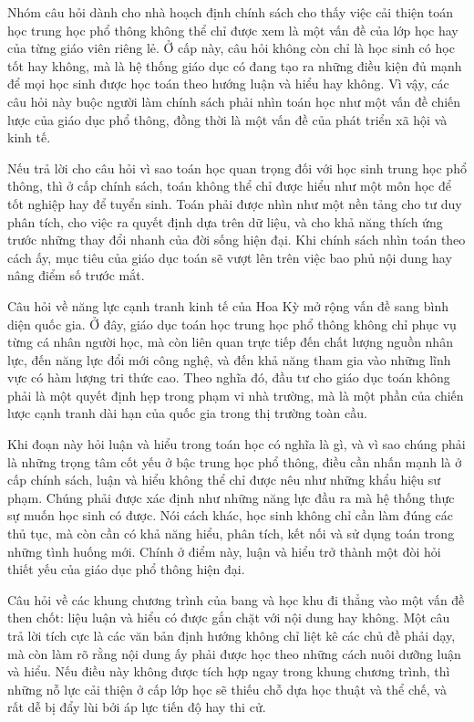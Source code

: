 \documentclass[
  10pt,
  a4paper,
  landscape,
  twoside,
  openany
]{scrbook}
\newcommand{\NOTE}[1]{#1}
\begin{document}
{
\NOTE{Nhóm câu hỏi dành cho nhà hoạch định chính sách cho thấy việc cải thiện toán học trung học phổ thông không thể chỉ được xem là một vấn đề của lớp học hay của từng giáo viên riêng lẻ. Ở cấp này, câu hỏi không còn chỉ là học sinh có học tốt hay không, mà là hệ thống giáo dục có đang tạo ra những điều kiện đủ mạnh để mọi học sinh được học toán theo hướng luận và hiểu hay không. Vì vậy, các câu hỏi này buộc người làm chính sách phải nhìn toán học như một vấn đề chiến lược của giáo dục phổ thông, đồng thời là một vấn đề của phát triển xã hội và kinh tế.

Nếu trả lời cho câu hỏi vì sao toán học quan trọng đối với học sinh trung học phổ thông, thì ở cấp chính sách, toán không thể chỉ được hiểu như một môn học để tốt nghiệp hay để tuyển sinh. Toán phải được nhìn như một nền tảng cho tư duy phân tích, cho việc ra quyết định dựa trên dữ liệu, và cho khả năng thích ứng trước những thay đổi nhanh của đời sống hiện đại. Khi chính sách nhìn toán theo cách ấy, mục tiêu của giáo dục toán sẽ vượt lên trên việc bao phủ nội dung hay nâng điểm số trước mắt.

Câu hỏi về năng lực cạnh tranh kinh tế của Hoa Kỳ mở rộng vấn đề sang bình diện quốc gia. Ở đây, giáo dục toán học trung học phổ thông không chỉ phục vụ từng cá nhân người học, mà còn liên quan trực tiếp đến chất lượng nguồn nhân lực, đến năng lực đổi mới công nghệ, và đến khả năng tham gia vào những lĩnh vực có hàm lượng tri thức cao. Theo nghĩa đó, đầu tư cho giáo dục toán không phải là một quyết định hẹp trong phạm vi nhà trường, mà là một phần của chiến lược cạnh tranh dài hạn của quốc gia trong thị trường toàn cầu.

Khi đoạn này hỏi luận và hiểu trong toán học có nghĩa là gì, và vì sao chúng phải là những trọng tâm cốt yếu ở bậc trung học phổ thông, điều cần nhấn mạnh là ở cấp chính sách, luận và hiểu không thể chỉ được nêu như những khẩu hiệu sư phạm. Chúng phải được xác định như những năng lực đầu ra mà hệ thống thực sự muốn học sinh có được. Nói cách khác, học sinh không chỉ cần làm đúng các thủ tục, mà còn cần có khả năng hiểu, phân tích, kết nối và sử dụng toán trong những tình huống mới. Chính ở điểm này, luận và hiểu trở thành một đòi hỏi thiết yếu của giáo dục phổ thông hiện đại.

Câu hỏi về các khung chương trình của bang và học khu đi thẳng vào một vấn đề then chốt: liệu luận và hiểu có được gắn chặt với nội dung hay không. Một câu trả lời tích cực là các văn bản định hướng không chỉ liệt kê các chủ đề phải dạy, mà còn làm rõ rằng nội dung ấy phải được học theo những cách nuôi dưỡng luận và hiểu. Nếu điều này không được tích hợp ngay trong khung chương trình, thì những nỗ lực cải thiện ở cấp lớp học sẽ thiếu chỗ dựa học thuật và thể chế, và rất dễ bị đẩy lùi bởi áp lực tiến độ hay thi cử.

}}
\end{document}
